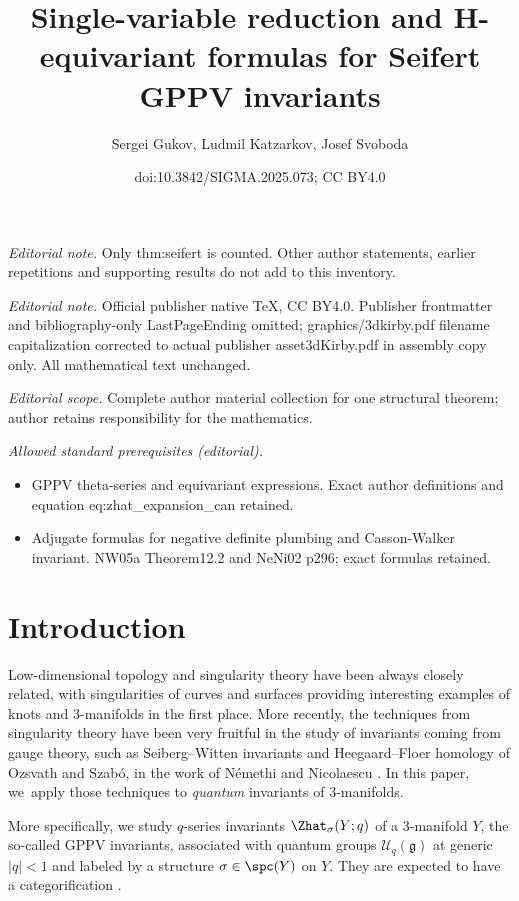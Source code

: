\documentclass[10pt,a4paper]{amsart}
\title{Single-variable reduction and H-equivariant formulas for Seifert GPPV invariants}
\author{Sergei Gukov, Ludmil Katzarkov, Josef Svoboda}
\date{doi:10.3842/SIGMA.2025.073; CC BY4.0}
\begin{document}
\maketitle
\noindent\textit{Editorial note.} Only thm:seifert is counted. Other author statements, earlier repetitions and supporting results do not add to this inventory.\par\medskip
\noindent\textit{Editorial note.} Official publisher native TeX, CC BY4.0. Publisher frontmatter and bibliography-only LastPageEnding omitted; graphics/3dkirby.pdf filename capitalization corrected to actual publisher asset3dKirby.pdf in assembly copy only. All mathematical text unchanged.\par\medskip
\noindent\textit{Editorial scope.} Complete author material collection for one structural theorem; author retains responsibility for the mathematics.\par\medskip
\noindent\textit{Allowed standard prerequisites (editorial).}\begin{itemize}
\item GPPV theta-series and equivariant expressions. Exact author definitions and equation eq:zhat\_expansion\_can retained.
\item Adjugate formulas for negative definite plumbing and Casson-Walker invariant. NW05a Theorem12.2 and NeNi02 p296; exact formulas retained.
\end{itemize}\medskip
\section{Introduction}\label{sec:intro}

Low-dimensional topology and singularity theory have been always closely related, with singularities of curves and surfaces providing interesting examples of knots and 3-manifolds in the first place. More recently, the techniques from singularity theory have been very fruitful in the study of invariants coming from gauge theory, such as Seiberg--Witten invariants and Heegaard--Floer homology of Ozsvath and Szab\'o, in the work of N\'emethi and Nicolaescu \cite{NeNi02}. In this paper, we~apply those techniques to \emph{quantum} invariants of 3-manifolds.

More specifically, we study $q$-series invariants $\Zhat_{\sigma}(Y; q)$ of a 3-manifold $Y$, the so-called GPPV invariants, associated with quantum groups $\mathcal{U}_q (\mathfrak{g})$ at generic $|q|<1$ and labeled by a \spc{} structure $\sigma \in \spc(Y)$ on $Y$. They are expected to have a categorification \cite{GPV16}.
\end{document}
